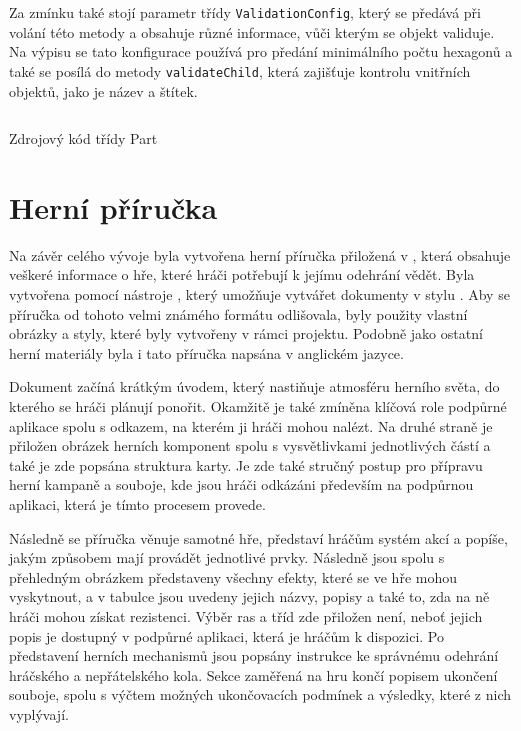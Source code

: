 Za zmínku také stojí parametr třídy  \texttt{ValidationConfig}, který se předává při volání této metody a obsahuje různé informace, vůči kterým se objekt validuje. Na výpisu se tato konfigurace používá pro předání minimálního počtu hexagonů a také se posílá do metody \texttt{validateChild}, která zajišťuje kontrolu vnitřních objektů, jako je název a štítek.

\begin{listing}[H]
    \inputminted{Java}{code/Part.java}
    \caption{Zdrojový kód třídy Part}
    \label{code:part}
\end{listing}

\newpage
\section{Herní příručka}
\label{sec:game_manual}

Na závěr celého vývoje byla vytvořena herní příručka přiložená v , která obsahuje veškeré informace o hře, které hráči potřebují k jejímu odehrání vědět. Byla vytvořena pomocí nástroje , který umožňuje vytvářet dokumenty v stylu \dnd{}. Aby se příručka od tohoto velmi známého formátu odlišovala, byly použity vlastní obrázky a styly, které byly vytvořeny v rámci projektu. Podobně jako ostatní herní materiály byla i tato příručka napsána v anglickém jazyce.

Dokument začíná krátkým úvodem, který nastiňuje atmosféru herního světa, do kterého se hráči plánují ponořit. Okamžitě je také zmíněna klíčová role podpůrné aplikace spolu s odkazem, na kterém ji hráči mohou nalézt. Na druhé straně je přiložen obrázek herních komponent spolu s vysvětlivkami jednotlivých částí a také je zde popsána struktura karty. Je zde také stručný postup pro přípravu herní kampaně a souboje, kde jsou hráči odkázáni především na podpůrnou aplikaci, která je tímto procesem provede.

Následně se příručka věnuje samotné hře, představí hráčům systém akcí a popíše, jakým způsobem mají provádět jednotlivé prvky. Následně jsou spolu s přehledným obrázkem představeny všechny efekty, které se ve hře mohou vyskytnout, a v tabulce jsou uvedeny jejich názvy, popisy a také to, zda na ně hráči mohou získat rezistenci. Výběr ras a tříd zde přiložen není, neboť jejich popis je dostupný v podpůrné aplikaci, která je hráčům k dispozici. Po představení herních mechanismů jsou popsány instrukce ke správnému odehrání hráčského a nepřátelského kola. Sekce zaměřená na hru končí popisem ukončení souboje, spolu s výčtem možných ukončovacích podmínek a výsledky, které z nich vyplývají.

